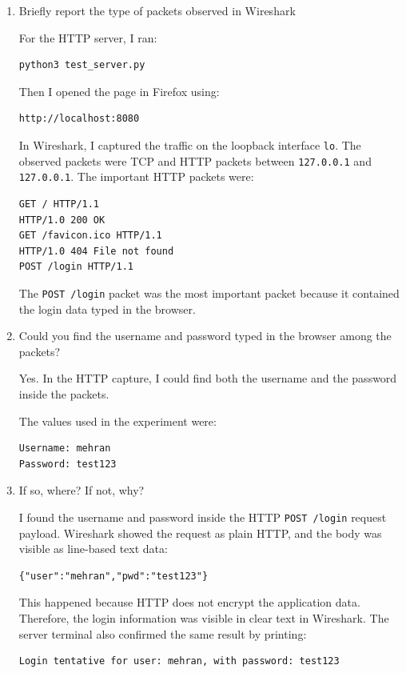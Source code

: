 \documentclass{article}
\begin{document}
\begin{enumerate}
    \item Briefly report the type of packets observed in Wireshark

    For the HTTP server, I ran:
    \begin{verbatim}
python3 test_server.py
    \end{verbatim}

    Then I opened the page in Firefox using:
    \begin{verbatim}
http://localhost:8080
    \end{verbatim}

    In Wireshark, I captured the traffic on the loopback interface \texttt{lo}. The observed packets were TCP and HTTP packets between \texttt{127.0.0.1} and \texttt{127.0.0.1}. The important HTTP packets were:
    \begin{verbatim}
GET / HTTP/1.1
HTTP/1.0 200 OK
GET /favicon.ico HTTP/1.1
HTTP/1.0 404 File not found
POST /login HTTP/1.1
    \end{verbatim}

    The \texttt{POST /login} packet was the most important packet because it contained the login data typed in the browser.

    \item Could you find the username and password typed in the browser among the packets?

    Yes. In the HTTP capture, I could find both the username and the password inside the packets.

    The values used in the experiment were:
    \begin{verbatim}
Username: mehran
Password: test123
    \end{verbatim}

    \item If so, where? If not, why?

    I found the username and password inside the HTTP \texttt{POST /login} request payload. Wireshark showed the request as plain HTTP, and the body was visible as line-based text data:
    \begin{verbatim}
{"user":"mehran","pwd":"test123"}
    \end{verbatim}

    This happened because HTTP does not encrypt the application data. Therefore, the login information was visible in clear text in Wireshark. The server terminal also confirmed the same result by printing:
    \begin{verbatim}
Login tentative for user: mehran, with password: test123
    \end{verbatim}
\end{enumerate}
\end{document}
